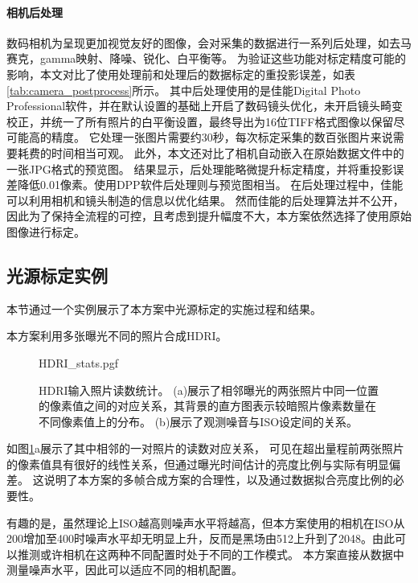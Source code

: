 \paragraph{相机后处理}
数码相机为呈现更加视觉友好的图像，会对采集的数据进行一系列后处理，如去马赛克，gamma映射、降噪、锐化、白平衡等。
为验证这些功能对标定精度可能的影响，本文对比了使用处理前和处理后的数据标定的重投影误差，如表\ref{tab:camera_postprocess}所示。
其中后处理使用的是佳能Digital Photo Professional软件，并在默认设置的基础上开启了数码镜头优化，未开启镜头畸变校正，并统一了所有照片的白平衡设置，最终导出为16位TIFF格式图像以保留尽可能高的精度。
它处理一张图片需要约30秒，每次标定采集的数百张图片来说需要耗费的时间相当可观。
此外，本文还对比了相机自动嵌入在原始数据文件中的一张JPG格式的预览图。
结果显示，后处理能略微提升标定精度，并将重投影误差降低0.01像素。使用DPP软件后处理则与预览图相当。
在后处理过程中，佳能可以利用相机和镜头制造的信息以优化结果。
然而佳能的后处理算法并不公开，因此为了保持全流程的可控，且考虑到提升幅度不大，本方案依然选择了使用原始图像进行标定。

\subsection{光源标定实例}

本节通过一个实例展示了本方案中光源标定的实施过程和结果。

本方案利用多张曝光不同的照片合成HDRI。
\begin{figure}
    \centering
    {HDRI_stats.pgf}
    \caption[HDRI输入照片读数统计]{HDRI输入照片读数统计。
    (a)展示了相邻曝光的两张照片中同一位置的像素值之间的对应关系，其背景的直方图表示较暗照片像素数量在不同像素值上的分布。
    (b)展示了观测噪音与ISO设定间的关系。}
    \label{fig:HDRI_stat}
\end{figure}
如图\ref{fig:HDRI_stat}a展示了其中相邻的一对照片的读数对应关系，
可见在超出量程前两张照片的像素值具有很好的线性关系，但通过曝光时间估计的亮度比例与实际有明显偏差。
这说明了本方案的多帧合成方案的合理性，以及通过数据拟合亮度比例的必要性。

有趣的是，虽然理论上ISO越高则噪声水平将越高，但本方案使用的相机在ISO从200增加至400时噪声水平却无明显上升，反而是黑场由512上升到了2048。由此可以推测或许相机在这两种不同配置时处于不同的工作模式。
本方案直接从数据中测量噪声水平，因此可以适应不同的相机配置。

